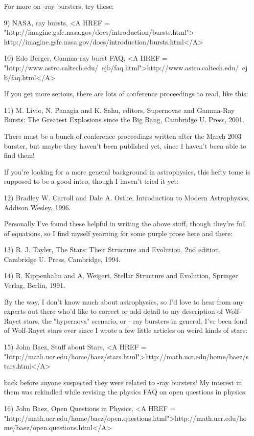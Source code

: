 For more on \gamma -ray bursters, try these:

9) NASA, \gamma  ray bursts, 
<A HREF = "http://imagine.gsfc.nasa.gov/docs/introduction/bursts.html">
http://imagine.gsfc.nasa.gov/docs/introduction/bursts.html</A>

10) Edo Berger, Gamma-ray burst FAQ, 
<A HREF = "http://www.astro.caltech.edu/~ejb/faq.html">http://www.astro.caltech.edu/~ejb/faq.html</A>

If you get more serious, there are lots of conference proceedings
to read, like this:

11) M. Livio, N. Panagia and K. Sahu, editors, Supernovae and Gamma-Ray
Bursts: The Greatest Explosions since the Big Bang, Cambridge U. Press,
2001.

There must be a bunch of conference proceedings written after the March 
2003 burster, but maybe they haven't been published yet, since I haven't 
been able to find them!

If you're looking for a more general background in astrophysics, this 
hefty tome is supposed to be a good intro, though I haven't tried it 
yet:

12) Bradley W. Carroll and Dale A. Ostlie, Introduction to Modern 
Astrophysics, Addison Wesley, 1996.

Personally I've found these helpful in writing the above stuff, though 
they're full of equations, so I find myself yearning for some purple 
prose here and there:

13) R. J. Tayler, The Stars: Their Structure and Evolution, 
2nd edition, Cambridge U. Press, Cambridge, 1994.

14) R. Kippenhahn and A. Weigert, Stellar Structure and Evolution,
Springer Verlag, Berlin, 1991.

By the way, I don't know much about astrophysics, so I'd love to hear
from any experts out there who'd like to correct or add detail to my
description of Wolf-Rayet stars, the "hypernova" scenario, or \gamma -
ray bursters in general.  I've been fond of Wolf-Rayet stars ever
since I wrote a few little articles on weird kinds of stars:

15) John Baez, Stuff about Stars, 
<A HREF = "http://math.ucr.edu/home/baez/stars.html">http://math.ucr.edu/home/baez/stars.html</A>

back before anyone suspected they were related to \gamma -ray bursters!
My interest in them was rekindled while revising the physics FAQ on 
open questions in physics:

16) John Baez, Open Questions in Physics, 
<A HREF = "http://math.ucr.edu/home/baez/open.questions.html">http://math.ucr.edu/home/baez/open.questions.html</A>

